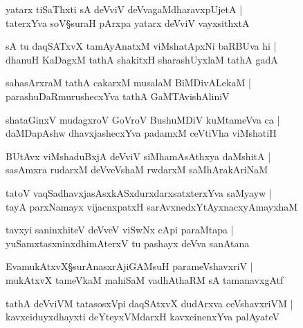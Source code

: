 \begin{shloka}
yatarx tiSaThxti sA deVviV deVvagaMdharavxpUjetA |\\
taterxYva soV\S suraH pArxpa yatarx deVviV vayxsithxtA 
\end{shloka}

\begin{shloka}
sA tu daqSATxvX tamAyAnatxM viMshatApxNi baRBUva hi |\\
dhanuH KaDagxM tathA shakitxH sharashUyxlaM tathA gadA
\end{shloka}

\begin{shloka}
sahasArxraM tathA cakarxM musalaM BiMDivALekaM |\\
parashuDaRmurushecxYva tathA GaMTAvishAliniV
\end{shloka}

\begin{shloka}
shataGinxV mudagxroV GoVroV BushuMDiV kuMtameVva ca |\\
daMDapAshw dhavxjashecxYva padamxM ceVtiVha viMshatiH 
\end{shloka}

\begin{shloka}
BUtAvx viMshaduBxjA deVviV siMhamAsAthxya daMshitA |\\
sasAmxra rudarxM deVveVshaM rwdarxM saMhArakAriNaM 
\end{shloka}

\begin{shloka}
tatoV vaqSadhavxjasAsxkASxdurxdarxsatxterxYva saMyayw |\\
tayA parxNamayx vijacnxpatxH sarAvxnedxYtAyxnacxyAmayxhaM 
\end{shloka}

\begin{shloka}
tavxyi saninxhiteV deVveV viSwNx cApi paraMtapa |\\
yuSamxtasxninxdhimAterxV tu pashayx deVva sanAtana 
\end{shloka}

\begin{shloka}
EvamukAtxvX\S surAnasxrA\R jiGAMsuH parameVshavxriV |\\
mukAtxvX tameVkaM mahiSaM vadhAthaRM sA tamanavxgAtf
\end{shloka}

\begin{shloka}
tathA deVviVM tatasosxVpi daqSAtxvX dudArxva ceVshavxriVM |\\
kavxciduyxdhayxti deYteyxVMdarxH kavxcinenxYva palAyateV
\end{shloka}

